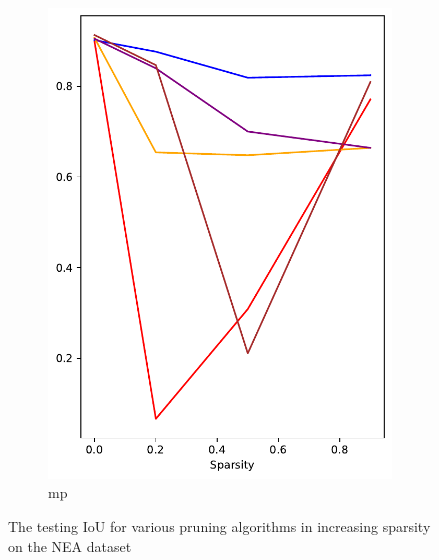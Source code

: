 \documentclass[mathematics,article,submit,pdftex,moreauthors]{Definitions/mdpi}
\begin{document}
\begin{figure}[!ht]
\begin{subfigure}[t]{.276\textwidth}
        \includegraphics[width=.95\linewidth]{figures/test/pruning-testing-score_NEA_movement.pdf}
        \caption{\ac{mp}}
        \label{fig:results:test:nea:mp}
      \end{subfigure}
      \caption{The testing IoU for various pruning algorithms in increasing sparsity on the NEA dataset}
      \label{fig:results:test:nea}
\end{figure}
\end{document}

